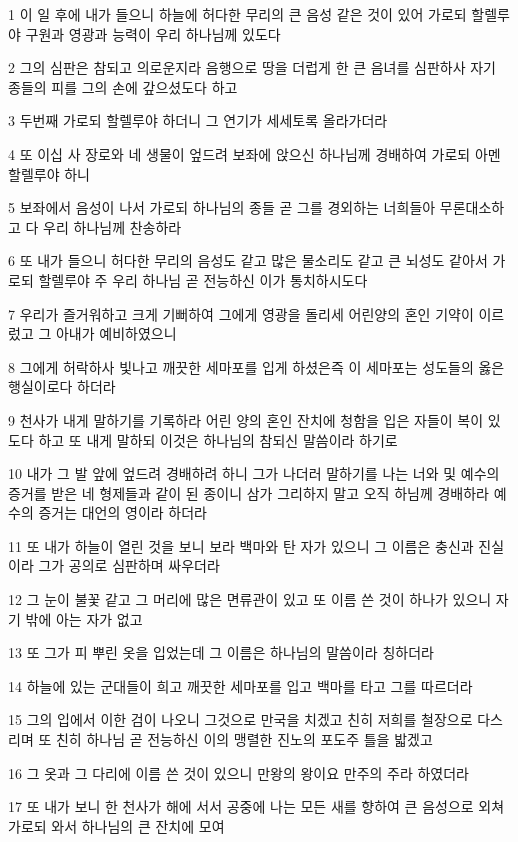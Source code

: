 \par 1 이 일 후에 내가 들으니 하늘에 허다한 무리의 큰 음성 같은 것이 있어 가로되 할렐루야 구원과 영광과 능력이 우리 하나님께 있도다
\par 2 그의 심판은 참되고 의로운지라 음행으로 땅을 더럽게 한 큰 음녀를 심판하사 자기 종들의 피를 그의 손에 갚으셨도다 하고
\par 3 두번째 가로되 할렐루야 하더니 그 연기가 세세토록 올라가더라
\par 4 또 이십 사 장로와 네 생물이 엎드려 보좌에 앉으신 하나님께 경배하여 가로되 아멘 할렐루야 하니
\par 5 보좌에서 음성이 나서 가로되 하나님의 종들 곧 그를 경외하는 너희들아 무론대소하고 다 우리 하나님께 찬송하라
\par 6 또 내가 들으니 허다한 무리의 음성도 같고 많은 물소리도 같고 큰 뇌성도 같아서 가로되 할렐루야 주 우리 하나님 곧 전능하신 이가 통치하시도다
\par 7 우리가 즐거워하고 크게 기뻐하여 그에게 영광을 돌리세 어린양의 혼인 기약이 이르렀고 그 아내가 예비하였으니
\par 8 그에게 허락하사 빛나고 깨끗한 세마포를 입게 하셨은즉 이 세마포는 성도들의 옳은 행실이로다 하더라
\par 9 천사가 내게 말하기를 기록하라 어린 양의 혼인 잔치에 청함을 입은 자들이 복이 있도다 하고 또 내게 말하되 이것은 하나님의 참되신 말씀이라 하기로
\par 10 내가 그 발 앞에 엎드려 경배하려 하니 그가 나더러 말하기를 나는 너와 및 예수의 증거를 받은 네 형제들과 같이 된 종이니 삼가 그리하지 말고 오직 하님께 경배하라 예수의 증거는 대언의 영이라 하더라
\par 11 또 내가 하늘이 열린 것을 보니 보라 백마와 탄 자가 있으니 그 이름은 충신과 진실이라 그가 공의로 심판하며 싸우더라
\par 12 그 눈이 불꽃 같고 그 머리에 많은 면류관이 있고 또 이름 쓴 것이 하나가 있으니 자기 밖에 아는 자가 없고
\par 13 또 그가 피 뿌린 옷을 입었는데 그 이름은 하나님의 말씀이라 칭하더라
\par 14 하늘에 있는 군대들이 희고 깨끗한 세마포를 입고 백마를 타고 그를 따르더라
\par 15 그의 입에서 이한 검이 나오니 그것으로 만국을 치겠고 친히 저희를 철장으로 다스리며 또 친히 하나님 곧 전능하신 이의 맹렬한 진노의 포도주 틀을 밟겠고
\par 16 그 옷과 그 다리에 이름 쓴 것이 있으니 만왕의 왕이요 만주의 주라 하였더라
\par 17 또 내가 보니 한 천사가 해에 서서 공중에 나는 모든 새를 향하여 큰 음성으로 외쳐 가로되 와서 하나님의 큰 잔치에 모여
